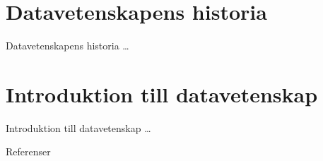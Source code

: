 \documentclass{beamer}
\begin{document}
\section[Historia]{Datavetenskapens historia}
\begin{frame}{Datavetenskapens historia}
	\dots
\end{frame}


\section[Introduktion]{Introduktion till datavetenskap}
\begin{frame}{Introduktion till datavetenskap}
	\dots
\end{frame}



\begin{frame}{Referenser}
  \printbibliography
\end{frame}
\end{document}

